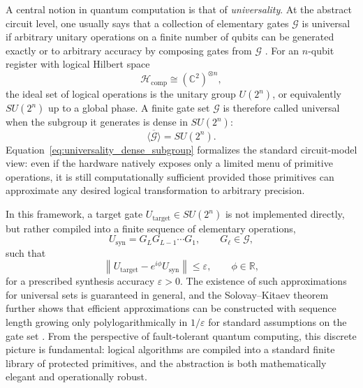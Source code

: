A central notion in quantum computation is that of \emph{universality}. At the abstract circuit level, one usually says that a collection of elementary gates $\mathcal{G}$ is universal if arbitrary unitary operations on a finite number of qubits can be generated exactly or to arbitrary accuracy by composing gates from $\mathcal{G}$ \cite{NielsenChuang2010,Dawson2005}. For an $n$-qubit register with logical Hilbert space
\begin{equation}
\mathcal{H}_{\mathrm{comp}} \cong (\mathbb{C}^{2})^{\otimes n},
\label{eq:logical_hilbert_space_section13}
\end{equation}
the ideal set of logical operations is the unitary group $U(2^n)$, or equivalently $SU(2^n)$ up to a global phase. A finite gate set $\mathcal{G}$ is therefore called universal when the subgroup it generates is dense in $SU(2^n)$:
\begin{equation}
\overline{\langle \mathcal{G} \rangle} = SU(2^n).
\label{eq:universality_dense_subgroup}
\end{equation}
Equation~\eqref{eq:universality_dense_subgroup} formalizes the standard circuit-model view: even if the hardware natively exposes only a limited menu of primitive operations, it is still computationally sufficient provided those primitives can approximate any desired logical transformation to arbitrary precision.

In this framework, a target gate $U_{\mathrm{target}} \in SU(2^n)$ is not implemented directly, but rather compiled into a finite sequence of elementary operations,
\begin{equation}
U_{\mathrm{syn}}
=
G_{L}G_{L-1}\cdots G_{1},
\qquad
G_{\ell}\in\mathcal{G},
\label{eq:compiled_gate_sequence}
\end{equation}
such that
\begin{equation}
\left\|
U_{\mathrm{target}} - e^{i\phi} U_{\mathrm{syn}}
\right\|
\leq \varepsilon,
\qquad
\phi\in\mathbb{R},
\label{eq:circuit_approximation_error}
\end{equation}
for a prescribed synthesis accuracy $\varepsilon > 0$. The existence of such approximations for universal sets is guaranteed in general, and the Solovay--Kitaev theorem further shows that efficient approximations can be constructed with sequence length growing only polylogarithmically in $1/\varepsilon$ for standard assumptions on the gate set \cite{Dawson2005,NielsenChuang2010}. From the perspective of fault-tolerant quantum computing, this discrete picture is fundamental: logical algorithms are compiled into a standard finite library of protected primitives, and the abstraction is both mathematically elegant and operationally robust.

